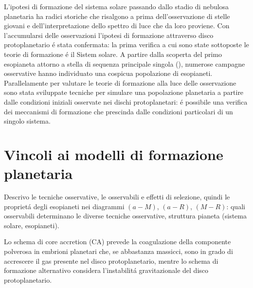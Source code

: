 \documentclass[twoside,11pt,fleqn]{memoir}%
\begin{document}
\begin{workout}
L'ipotesi di formazione del sistema solare passando dallo stadio di nebulosa planetaria ha radici storiche che risalgono a prima dell'osservazione di stelle giovani e dell'interpretazione dello spettro di luce che da loro proviene. Con l'accumularsi delle osservazioni l'ipotesi di formazione attraverso disco protoplanetario \'e stata confermata: la prima verifica a cui sono state sottoposte le teorie di formazione \'e il Sistem solare.
A partire dalla scoperta del primo esopianeta attorno a stella di sequenza principale singola (\cite{mayor1995jupiter}), numerose campagne osservative hanno individuato una cospicua popolazione di esopianeti. Parallelamente per valutare le teorie di formazione alla luce delle osservazione sono stata sviluppate tecniche per simulare una popolazione planetaria a partire dalle condizioni iniziali osservate nei dischi protoplanetari: \'e possibile una verifica dei meccanismi di formazione che prescinda dalle condizioni particolari di un singolo sistema.
\end{workout}

{\let\clearpage\relax\let\cleardoublepage\relax
\part{Vincoli ai modelli di formazione planetaria}
}
\begin{workout}
Descrivo le tecniche osservative, le osservabili e effetti di selezione, quindi le propriet\'a degli esopianeti nei diagrammi $(a-M)$, $(a-R)$, $(M-R)$: quali osservabili determinano le diverse tecniche osservative, struttura pianeta (sistema solare, esopianeti).
\end{workout}
Lo schema di core accretion (CA) prevede la coagulazione della componente polverosa in embrioni planetari che, se abbastanza massicci, sono in grado di accrescere il gas presente nel disco protoplanetario, mentre lo schema di formazione alternativo considera l'instabilit\'a gravitazionale del disco protoplanetario.
\end{document}
